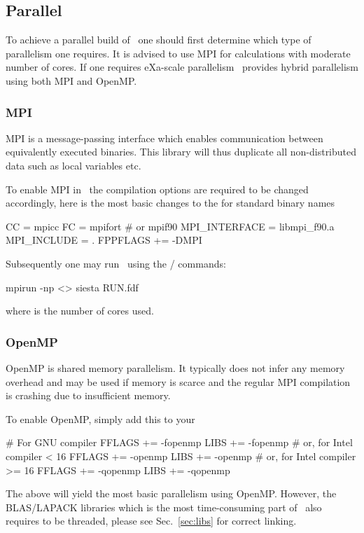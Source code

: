 \subsection{Parallel}

To achieve a parallel build of \siesta\ one should first determine
which type of parallelism one requires. It is advised to use MPI for
calculations with moderate number of cores. If one requires eXa-scale
parallelism \siesta\ provides hybrid parallelism using both MPI and
OpenMP. 


\subsubsection{MPI}

MPI is a message-passing interface which enables communication between
equivalently executed binaries. This library will thus duplicate all
non-distributed data such as local variables etc. 

To enable MPI in \siesta\ the compilation options are required to be
changed accordingly, here is the most basic changes to the
 for standard binary names
\begin{shellexample}
  CC = mpicc
  FC = mpifort # or mpif90
  MPI_INTERFACE = libmpi_f90.a
  MPI_INCLUDE = .
  FPPFLAGS += -DMPI
\end{shellexample}


Subsequently one may run \siesta\ using the
/ commands:
\begin{shellexample}
  mpirun -np <> siesta RUN.fdf
\end{shellexample}
where \shell{<>} is the number of cores used.


\subsubsection{OpenMP}

OpenMP is shared memory parallelism. It typically does not infer any
memory overhead and may be used if memory is scarce and the regular
MPI compilation is crashing due to insufficient memory.

To enable OpenMP, simply add this to your 
\begin{shellexample}
  # For GNU compiler
  FFLAGS += -fopenmp
  LIBS += -fopenmp
  # or, for Intel compiler < 16
  FFLAGS += -openmp
  LIBS += -openmp
  # or, for Intel compiler >= 16
  FFLAGS += -qopenmp
  LIBS += -qopenmp
\end{shellexample}
The above will yield the most basic parallelism using OpenMP. However,
the BLAS/LAPACK libraries which is the most time-consuming part of
\siesta\ also requires to be threaded, please see Sec.~\ref{sec:libs}
for correct linking.

